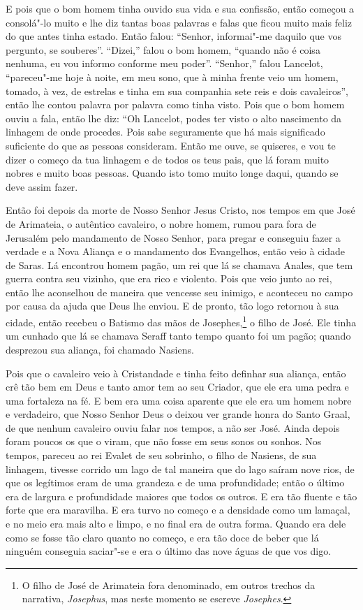 E pois que o bom homem tinha ouvido sua vida e sua confissão, então começou
a consolá"-lo muito e lhe diz tantas boas palavras e falas que ficou muito mais
feliz do que antes tinha estado. Então falou: “Senhor, informai"-me daquilo que
vos pergunto, se souberes”. “Dizei,” falou o bom homem, “quando não é coisa
nenhuma, eu vou informo conforme meu poder”. “Senhor,” falou Lancelot,
“pareceu"-me hoje à noite, em meu sono, que à minha frente veio um homem,
tomado, à vez, de estrelas e tinha em sua companhia sete reis e dois
cavaleiros”, então lhe contou palavra por palavra como tinha visto. Pois que o
bom homem ouviu a fala, então lhe diz: “Oh Lancelot, podes ter visto o alto
nascimento da linhagem de onde procedes. Pois sabe seguramente que há mais
significado suficiente do que as pessoas consideram. Então me ouve, se
quiseres, e vou te dizer o começo da tua linhagem e de todos os teus pais, que
lá foram muito nobres e muito boas pessoas. Quando isto tomo muito longe daqui,
quando se deve assim fazer.

Então foi depois da morte de Nosso Senhor Jesus Cristo, nos tempos em que
José de Arimateia, o autêntico cavaleiro, o nobre homem, rumou para fora de
Jerusalém pelo mandamento de Nosso Senhor, para pregar e conseguiu fazer a
verdade e a Nova Aliança e o mandamento dos Evangelhos, então veio à cidade de
Saras. Lá encontrou homem pagão, um rei que lá se chamava Anales, que tem
guerra contra seu vizinho, que era rico e violento. Pois que veio junto ao rei,
então lhe aconselhou de maneira que vencesse seu inimigo, e aconteceu no campo
por causa da ajuda que Deus lhe enviou. E de pronto, tão logo retornou à sua
cidade, então recebeu o Batismo das mãos de Josephes,\footnote{ O filho de José
de Arimateia fora denominado, em outros trechos da narrativa,
\textit{Josephus}, mas neste momento se escreve \textit{Josephes}. 
} o filho de José. Ele tinha um cunhado que lá se chamava Seraff tanto tempo
quanto foi um pagão; quando desprezou sua aliança, foi chamado Nasiens.

  Pois que o cavaleiro veio à Cristandade e tinha feito definhar sua
aliança, então crê tão bem em Deus e tanto amor tem ao seu Criador, que ele era
uma pedra e uma fortaleza na fé. E bem era uma coisa aparente que ele era um
homem nobre e verdadeiro, que Nosso Senhor Deus o deixou ver grande honra do
Santo Graal, de que nenhum cavaleiro ouviu falar nos tempos, a não ser José.
Ainda depois foram poucos os que o viram, que não fosse em seus sonos ou
sonhos. Nos tempos, pareceu ao rei Evalet de seu sobrinho, o filho de Nasiens,
de sua linhagem, tivesse corrido um lago de tal maneira que do lago saíram nove
rios, de que os legítimos eram de uma grandeza e de uma profundidade; então o
último era de largura e profundidade maiores que todos os outros. E era tão
fluente e tão forte que era maravilha. E era turvo no começo e a densidade como
um lamaçal, e no meio era mais alto e limpo, e no final era de outra forma.
Quando era dele como se fosse tão claro quanto no começo, e era tão doce de
beber que lá ninguém conseguia saciar"-se e era o último das nove águas de que
vos digo.

